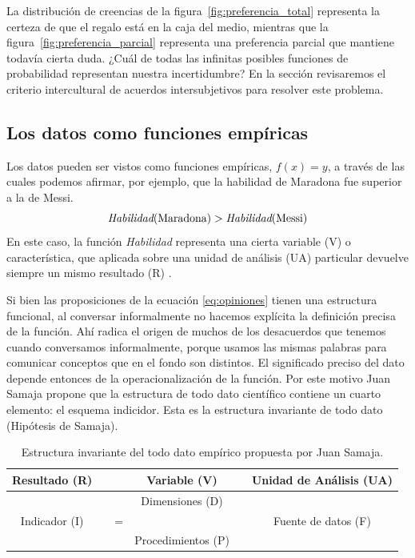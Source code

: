\documentclass[a4paper,10pt]{book}
\theoremstyle{definition}
\begin{document}
La distribución de creencias de la figura~\ref{fig:preferencia_total} representa la certeza de que el regalo está en la caja del medio, mientras que la figura~\ref{fig:preferencia_parcial} representa una preferencia parcial que mantiene todavía cierta duda.
¿Cuál de todas las infinitas posibles funciones de probabilidad representan nuestra incertidumbre?
En la sección  revisaremos el criterio intercultural de acuerdos intersubjetivos para resolver este problema.

\subsection{Los datos como funciones empíricas}

Los datos pueden ser vistos como funciones empíricas, $f(x)=y$, a través de las cuales podemos afirmar, por ejemplo, que la habilidad de Maradona fue superior a la de Messi.
\begin{equation}\label{eq:opiniones}
 \emph{Habilidad}(\text{Maradona}) > \emph{Habilidad}(\text{Messi})
\end{equation}
En este caso, la función \emph{Habilidad} representa una cierta variable (V) o característica, que aplicada sobre una unidad de análisis (UA) particular devuelve siempre un mismo resultado (R) .


Si bien las proposiciones de la ecuación \ref{eq:opiniones} tienen una estructura funcional, al conversar informalmente no hacemos explícita la definición precisa de la función.
Ahí radica el origen de muchos de los desacuerdos que tenemos cuando conversamos informalmente, porque usamos las mismas palabras para comunicar conceptos que en el fondo son distintos.
El significado preciso del dato depende entonces de la operacionalización de la función.
Por este motivo Juan Samaja propone que la estructura de todo dato científico contiene un cuarto elemento: el esquema indicidor.
Esta es la estructura invariante de todo dato (Hipótesis de Samaja).

\begin{table}[ht!]
\centering
\begin{tabular}{clcccc}
Resultado (R) & \multicolumn{1}{r|}{} &  & Variable (V) &  &  \multicolumn{1}{|c}{Unidad de Análisis (UA)} \\ \hline
   &  \multicolumn{1}{r|}{}    &  & Dimensiones (D) &  & \multicolumn{1}{|r}{} \\
                 Indicador (I)  &   & =  &  &  &  Fuente de datos (F) \\
 & \multicolumn{1}{r|}{} &  & Procedimientos (P) &        &    \multicolumn{1}{|r}{}  
\end{tabular}
\caption{Estructura invariante del todo dato empírico propuesta por Juan Samaja.}
\label{tab:matriz_datos}
\end{table}
\end{document}
